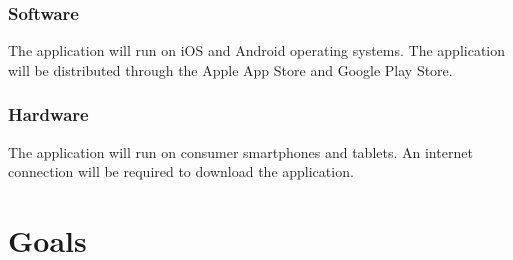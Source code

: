 \documentclass{article}
\begin{document}
\subsubsection{Software}

The application will run on iOS and Android operating systems. The application will be distributed through the Apple App Store and Google Play Store.

\subsubsection{Hardware}

The application will run on consumer smartphones and tablets. An internet connection will be required to download the application.

\section{Goals}
\end{document}

